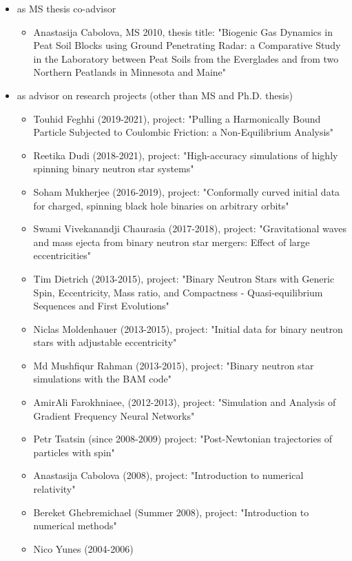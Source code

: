 \documentclass[11pt]{article}
\begin{document}
\begin{itemize}
\begin{itemize}
	\end{itemize}
\item	as MS thesis co-advisor
	\begin{itemize}
	\item	Anastasija Cabolova, MS 2010,
		thesis title:
		"Biogenic Gas Dynamics in Peat Soil Blocks using Ground
		Penetrating Radar: a Comparative Study in the Laboratory
		between Peat Soils from the Everglades and from two Northern
		Peatlands in Minnesota and Maine"
	\end{itemize}
\item	as advisor on research projects (other than MS and Ph.D. thesis)
	\begin{itemize}
	\item	Touhid Feghhi (2019-2021),
		project:
		"Pulling a Harmonically Bound Particle Subjected to
		Coulombic Friction: a Non-Equilibrium Analysis"
	\item	Reetika Dudi (2018-2021),
		project:
		"High-accuracy simulations of highly spinning binary
		neutron star systems"
	\item	Soham Mukherjee (2016-2019),
		project:
		"Conformally curved initial data for charged, spinning black
		hole binaries on arbitrary orbits"
	\item	Swami Vivekanandji Chaurasia (2017-2018),
		project:
		"Gravitational waves and mass ejecta from binary neutron
		star mergers: Effect of large eccentricities"
	\item	Tim Dietrich (2013-2015),
		project:
		"Binary Neutron Stars with Generic Spin, Eccentricity, Mass
		ratio, and Compactness - Quasi-equilibrium Sequences and
		First Evolutions"
	\item	Niclas Moldenhauer (2013-2015),
		project:
		"Initial data for binary neutron stars with adjustable
		eccentricity"
	\item	Md Mushfiqur Rahman (2013-2015),
		project:
		"Binary neutron star simulations with the BAM code"
	\item	AmirAli Farokhniaee, (2012-2013),
		project:
		"Simulation and Analysis of Gradient Frequency Neural
		Networks"
	\item	Petr Tsatsin (since 2008-2009)
		project:
		"Post-Newtonian trajectories of particles with spin"
	\item	Anastasija Cabolova (2008),
		project:
		"Introduction to numerical relativity"
	\item	Bereket Ghebremichael (Summer 2008),
		project:
		"Introduction to numerical methods"
	\item	Nico Yunes (2004-2006)

\end{itemize}
\end{itemize}
\end{document}
